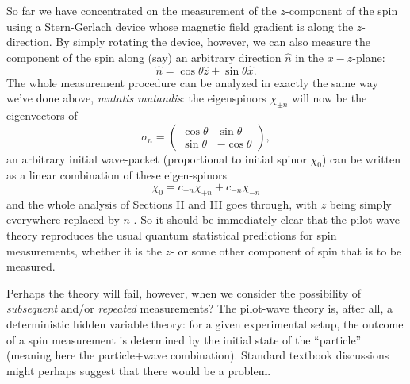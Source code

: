 \documentclass[aps,prc,onecolumn,letterpaper,floatfix,12pt]{revtex4}
\begin{document}
So far we have concentrated on the measurement of the $z$-component of
the spin using a Stern-Gerlach device whose magnetic field gradient is
along the $z$-direction.  By simply rotating the device, however, we can
also measure the component of the spin along (say) an arbitrary
direction $\hat{n}$ in the $x-z$-plane:
\begin{equation}
\hat{n} = \cos\theta \hat{z} + \sin \theta \hat{x}.
\end{equation}
The whole measurement procedure can be analyzed in exactly the same
way we've done above, \emph{mutatis mutandis}:  the eigenspinors
$\chi_{\pm n}$ will now be the eigenvectors of 
\begin{equation}
\sigma_n = \left( \begin{array}{cc} 
\cos \theta & \sin \theta \\
\sin \theta & -\cos \theta \end{array} \right),
\end{equation}
an arbitrary initial wave-packet (proportional to initial spinor
$\chi_0$) can be written as a linear combination of these
eigen-spinors
\begin{equation}
\chi_0 = c_{+n} \chi_{+n} + c_{-n} \chi_{-n}
\end{equation}
and the whole analysis of Sections II and III goes through, with $z$
being simply everywhere replaced by $n$ \cite{angle}.  
So it should be immediately
clear that the pilot wave theory reproduces the usual quantum
statistical predictions for spin measurements, whether it is the $z$-
or some other component of spin that is to be measured.  

Perhaps the theory will fail, however, when we consider the
possibility of \emph{subsequent} and/or \emph{repeated} measurements?
The pilot-wave theory is, after all, a deterministic hidden variable
theory:  for a given experimental setup, 
the outcome of a spin measurement is determined by
the initial state of the ``particle'' (meaning here the particle+wave 
combination).  Standard textbook discussions might perhaps suggest
that there would be a problem.  
\end{document}
